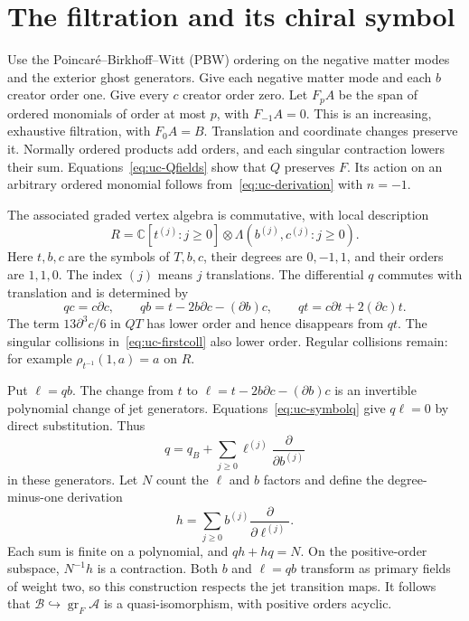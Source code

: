 \section{The filtration and its chiral symbol}

Use the Poincar\'e--Birkhoff--Witt (PBW) ordering on the negative matter modes and the exterior ghost generators.
Give each negative matter mode and each $b$ creator order one.
Give every $c$ creator order zero.
Let $F_pA$ be the span of ordered monomials of order at most $p$, with $F_{-1}A=0$.
This is an increasing, exhaustive filtration, with $F_0A=B$.
Translation and coordinate changes preserve it.
Normally ordered products add orders, and each singular contraction lowers their sum.
Equations~\eqref{eq:uc-Qfields} show that $Q$ preserves $F$.
Its action on an arbitrary ordered monomial follows from~\eqref{eq:uc-derivation} with $n=-1$.

The associated graded vertex algebra is commutative, with local description
\begin{equation}\label{eq:uc-symbolalg}
 R=\mathbb C[t^{(j)}:j\geq0]\otimes
 \Lambda(b^{(j)},c^{(j)}:j\geq0).
\end{equation}
Here $t,b,c$ are the symbols of $T,b,c$, their degrees are $0,-1,1$, and their orders are $1,1,0$.
The index $(j)$ means $j$ translations.
The differential $q$ commutes with translation and is determined by
\begin{equation}\label{eq:uc-symbolq}
 qc=c\partial c,\qquad
 qb=t-2b\partial c-(\partial b)c,\qquad
 qt=c\partial t+2(\partial c)t.
\end{equation}
The term $13\partial^3c/6$ in $QT$ has lower order and hence disappears from $qt$.
The singular collisions in~\eqref{eq:uc-firstcoll} also lower order.
Regular collisions remain: for example $\rho_{t^{-1}}(1,a)=a$ on $R$.

Put $\ell=qb$.
The change from $t$ to $\ell=t-2b\partial c-(\partial b)c$ is an invertible polynomial change of jet generators.
Equations~\eqref{eq:uc-symbolq} give $q\ell=0$ by direct substitution.
Thus
\[
 q= q_B+\sum_{j\geq0}\ell^{(j)}\frac{\partial}{\partial b^{(j)}}
\]
in these generators.
Let $N$ count the $\ell$ and $b$ factors and define the degree-minus-one derivation
\[
 h=\sum_{j\geq0}b^{(j)}\frac{\partial}{\partial\ell^{(j)}}.
\]
Each sum is finite on a polynomial, and $qh+hq=N$.
On the positive-order subspace, $N^{-1}h$ is a contraction.
Both $b$ and $\ell=qb$ transform as primary fields of weight two, so this construction respects the jet transition maps.
It follows that $\mathcal B\hookrightarrow\operatorname{gr}_F\mathcal A$ is a quasi-isomorphism, with positive orders acyclic.

